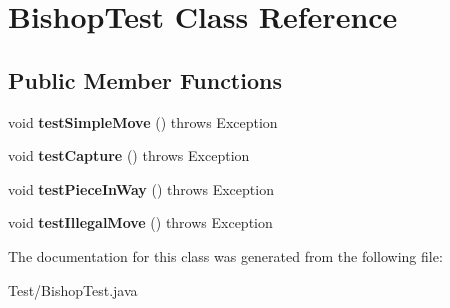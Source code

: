 \hypertarget{class_bishop_test}{}\section{Bishop\+Test Class Reference}
\label{class_bishop_test}
\subsection*{Public Member Functions}
\begin{DoxyCompactItemize}
\item 
\hypertarget{class_bishop_test_a7028c52f8952b85a212e94413377dd1d}{}void {\bfseries test\+Simple\+Move} ()  throws Exception \label{class_bishop_test_a7028c52f8952b85a212e94413377dd1d}

\item 
\hypertarget{class_bishop_test_abbec6ec95aa8fb463dc3509d2ee5c4af}{}void {\bfseries test\+Capture} ()  throws Exception \label{class_bishop_test_abbec6ec95aa8fb463dc3509d2ee5c4af}

\item 
\hypertarget{class_bishop_test_acc47e5046fcdfc06da3a36505cc02857}{}void {\bfseries test\+Piece\+In\+Way} ()  throws Exception \label{class_bishop_test_acc47e5046fcdfc06da3a36505cc02857}

\item 
\hypertarget{class_bishop_test_ab3de9c5e3de068dfb4c82a5d27bdd61e}{}void {\bfseries test\+Illegal\+Move} ()  throws Exception \label{class_bishop_test_ab3de9c5e3de068dfb4c82a5d27bdd61e}

\end{DoxyCompactItemize}


The documentation for this class was generated from the following file\+:\begin{DoxyCompactItemize}
\item 
Test/Bishop\+Test.\+java\end{DoxyCompactItemize}
